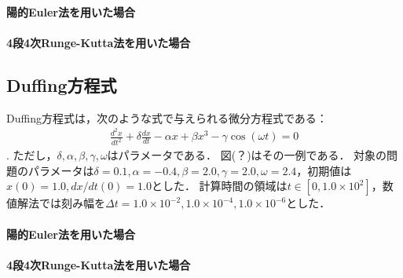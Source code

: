 \paragraph*{陽的Euler法を用いた場合}

\paragraph*{4段4次Runge-Kutta法を用いた場合}

\subsection{Duffing方程式}
Duffing方程式は，次のような式で与えられる微分方程式である：
\begin{align}
    \frac{d^2 x}{dt^2} + \delta\frac{dx}{dt} - \alpha x + \beta x^3 - \gamma \cos(\omega t) = 0
\end{align}.
ただし，$\delta,\alpha,\beta,\gamma,\omega$はパラメータである．
図(？)はその一例である．
対象の問題のパラメータは$\delta=0.1, \alpha=-0.4, \beta=2.0, \gamma=2.0, \omega=2.4$，初期値は$x(0) = 1.0, dx/dt(0) = 1.0$とした．
計算時間の領域は$t \in [0,1.0 \times 10^2]$，数値解法では刻み幅を$\Delta t =  1.0 \times 10^{-2},1.0 \times 10^{-4}, 1.0 \times 10^{-6}$とした．
\paragraph*{陽的Euler法を用いた場合}

\paragraph*{4段4次Runge-Kutta法を用いた場合}

